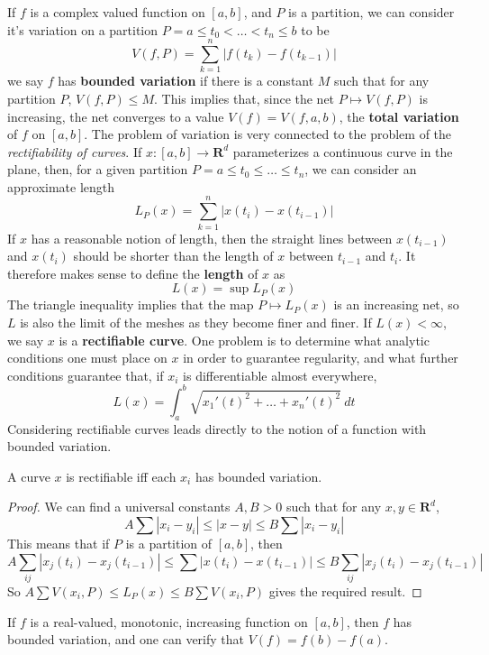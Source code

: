 If $f$ is a complex valued function on $[a,b]$, and $P$ is a partition, we can consider it's variation on a partition $P = a \leq t_0 < \dots < t_n \leq b$ to be
%
\[ V(f,P) = \sum_{k = 1}^n |f(t_k) - f(t_{k-1})| \]
%
we say $f$ has {\bf bounded variation} if there is a constant $M$ such that for any partition $P$, $V(f,P) \leq M$. This implies that, since the net $P \mapsto V(f,P)$ is increasing, the net converges to a value $V(f) = V(f,a,b)$, the {\bf total variation} of $f$ on $[a,b]$. The problem of variation is very connected to the problem of the {\it rectifiability of curves}. If $x: [a,b] \to \mathbf{R}^d$ parameterizes a continuous curve in the plane, then, for a given partition $P = a \leq t_0 \leq \dots \leq t_n$, we can consider an approximate length
%
\[ L_P(x) = \sum_{k = 1}^n |x(t_i) - x(t_{i-1})| \]
%
If $x$ has a reasonable notion of length, then the straight lines between $x(t_{i-1})$ and $x(t_i)$ should be shorter than the length of $x$ between $t_{i-1}$ and $t_i$. It therefore makes sense to define the {\bf length} of $x$ as
%
\[ L(x) = \sup L_P(x) \]
%
The triangle inequality implies that the map $P \mapsto L_P(x)$ is an increasing net, so $L$ is also the limit of the meshes as they become finer and finer. If $L(x) < \infty$, we say $x$ is a {\bf rectifiable curve}. One problem is to determine what analytic conditions one must place on $x$ in order to guarantee regularity, and what further conditions guarantee that, if $x_i$ is differentiable almost everywhere,
%
\[ L(x) = \int_a^b \sqrt{x_1'(t)^2 + \dots + x_n'(t)^2}\ dt \]
%
Considering rectifiable curves leads directly to the notion of a function with bounded variation.

\begin{theorem}
    A curve $x$ is rectifiable iff each $x_i$ has bounded variation.
\end{theorem}
\begin{proof}
    We can find a universal constants $A,B > 0$ such that for any $x,y \in \mathbf{R}^d$,
    \[ A \sum |x_i - y_i| \leq |x-y| \leq B \sum |x_i - y_i| \]
    This means that if $P$ is a partition of $[a,b]$, then
    \[ A \sum_{ij} |x_j(t_i) - x_j(t_{i-1})| \leq \sum |x(t_i) - x(t_{i-1})| \leq B \sum_{ij} |x_j(t_i) - x_j(t_{i-1})| \]
    So $A \sum V(x_i,P) \leq L_P(x) \leq B \sum V(x_i,P)$ gives the required result.
\end{proof}

\begin{example}
    If $f$ is a real-valued, monotonic, increasing function on $[a,b]$, then $f$ has bounded variation, and one can verify that $V(f) = f(b) - f(a)$.
\end{example}

